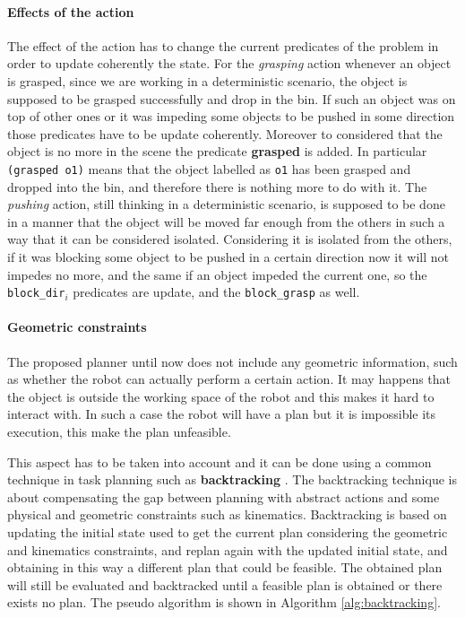 \paragraph{Effects of the action}
The effect of the action has to change the current predicates of the problem in order to update coherently the state. For the \textit{grasping} action whenever an object is grasped, since we are working in a deterministic scenario, the object is supposed to be grasped successfully and drop in the bin. If such an object was on top of other ones or it was impeding some objects to be pushed in some direction those predicates have to be update coherently. Moreover to considered that the object is no more in the scene the predicate \textbf{grasped} is added. In particular \texttt{(grasped o1)} means that the object labelled as \texttt{o1} has been grasped and dropped into the bin, and therefore there is nothing more to do with it. The \textit{pushing} action, still thinking in a deterministic scenario, is supposed to be done in a manner that the object will be moved far enough from the others in such a way that it can be considered isolated. Considering it is isolated from the others, if it was blocking some object to be pushed in a certain direction now it will not impedes no more, and the same if an object impeded the current one, so the \texttt{block\_dir}$_i$ predicates are update, and the \texttt{block\_grasp} as well.  

	
\paragraph{Geometric constraints}
The proposed planner until now does not include any geometric information, such as whether the robot can actually perform a certain action. It may happens that the object is outside the working space of the robot and this makes it hard to interact with. In such a case the robot will have a plan but it is impossible its execution, this make the plan unfeasible. 


This aspect has to be taken into account and it can be done using a common technique in task planning such as \textbf{backtracking} \citep{Bidot2015}. The backtracking technique is about compensating the gap between planning with abstract actions and some physical and geometric constraints such as kinematics. Backtracking is based on updating the initial state used to get the current plan considering the geometric and kinematics constraints, and replan again with the updated initial state, and obtaining in this way a different plan that could be feasible. The obtained plan will still be evaluated and backtracked until a feasible plan is obtained or there exists no plan. The pseudo algorithm is shown in Algorithm \ref{alg:backtracking}.

